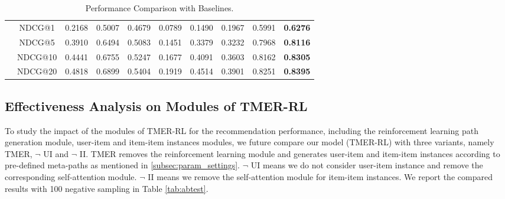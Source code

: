 \begin{table}[]
\begin{tabular}{|c|c|lllllllc|}
                                                                                        & NDCG@1  & 0.2168                      & 0.5007                    & 0.4679                    & 0.0789                  & 0.1490                     & 0.1967                    & 0.5991                   & \textbf{0.6276} \\
                                                                                        & NDCG@5  & 0.3910                      & 0.6494                    & 0.5083                    & 0.1451                  & 0.3379                     & 0.3232                    & 0.7968                   & \textbf{0.8116} \\
                                                                                        & NDCG@10 & 0.4441                      & 0.6755                    & 0.5247                    & 0.1677                  & 0.4091                     & 0.3603                    & 0.8162                   & \textbf{0.8305} \\
                                                                                        & NDCG@20 & 0.4818                      & 0.6899                    & 0.5404                    & 0.1919                  & 0.4514                     & 0.3901                    & 0.8251                   & \textbf{0.8395} \\ \hline
\end{tabular}\caption{Performance Comparison with Baselines.}\label{tab:baseline}
\end{table}

\subsection{Effectiveness Analysis on Modules of TMER-RL}
\label{subsec:abtest}

To study the impact of the modules of TMER-RL for the recommendation performance, including the reinforcement learning path generation module, user-item and item-item instances modules, we future compare our model (TMER-RL) with three variants, namely TMER, $\neg$ UI and $\neg$ II. TMER removes the reinforcement learning module and generates user-item and item-item instances according to pre-defined meta-paths as mentioned in \ref{subsec:param_settings}. $\neg$ UI means we do not consider user-item instance and remove the corresponding self-attention module. $\neg$ II means we remove the self-attention module for item-item instances. We report the compared results with 100 negative sampling in Table \ref{tab:abtest}. 


